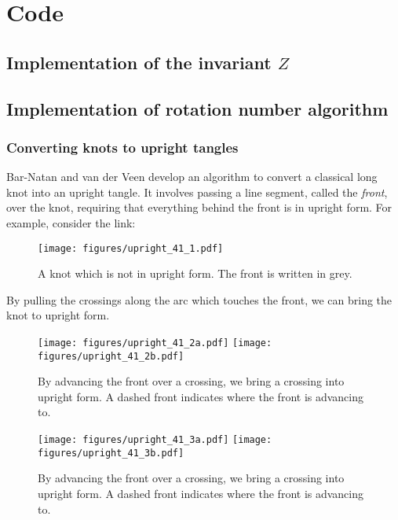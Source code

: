 \chapter{Code}
\section{Implementation of the invariant $Z$}



\section{Implementation of rotation number algorithm}


\subsection{Converting knots to upright tangles}

Bar-Natan and van der Veen develop an algorithm to convert a classical long knot
into an upright tangle. It involves passing a line segment, called the
\emph{front}, over the knot, requiring that everything behind the front is in
upright form. For example, consider the link:
\begin{figure}[h]
        \centering
        \texttt{[image: figures/upright\_41\_1.pdf]}
        \caption{A knot which is not in upright form. The front is written in
        grey.}
        \label{fig:figures-upright_41_1}
\end{figure}
By pulling the crossings along the arc which touches the front, we can bring the
knot to upright form.
\begin{figure}[h]
        \centering
        \texttt{[image: figures/upright\_41\_2a.pdf]}
        \texttt{[image: figures/upright\_41\_2b.pdf]}
        \caption{By advancing the front over a crossing, we bring a crossing
        into upright form. A dashed front indicates where the front is advancing
        to.
        }
        \label{fig:figures-upright_41_2}
\end{figure}
\begin{figure}[h]
        \centering
        \texttt{[image: figures/upright\_41\_3a.pdf]}
        \texttt{[image: figures/upright\_41\_3b.pdf]}
        \caption{By advancing the front over a crossing, we bring a crossing
        into upright form. A dashed front indicates where the front is advancing
        to.
        }
        \label{fig:figures-upright_41_3}
\end{figure}

